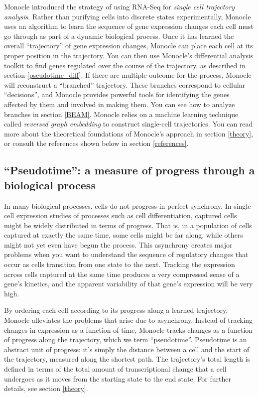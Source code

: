 \documentclass[10pt,oneside]{article}\usepackage[]{graphicx}\usepackage[]{color}
\begin{document}
 Monocle introduced the strategy of using RNA-Seq for \emph{single cell trajectory analysis}. Rather than purifying cells into discrete states experimentally, Monocle uses an algorithm to learn the sequence of gene expression changes each cell must go through as part of a dynamic biological process. Once it has learned the overall ``trajectory'' of gene expression changes, Monocle can place each cell at its proper position in the trajectory. You can then use Monocle's differential analysis toolkit to find genes regulated over the course of the trajectory, as described in section \ref{pseudotime_diff}. If there are multiple outcome for the process, Monocle will reconstruct a ``branched'' trajectory. These branches correspond to cellular ``decisions'', and Monocle provides powerful tools for identifying the genes affected by them and involved in making them. You can see how to analyze branches in section \ref{BEAM}. Monocle relies on a machine learning technique called \emph{reversed graph embedding} to construct single-cell trajectories. You can read more about the theoretical foundations of Monocle's approach in section \ref{theory}, or consult the references shown below in section \ref{references}.
 
 \subsection{``Pseudotime'': a measure of progress through a biological process }
 
 In many biological processes, cells do not progress in perfect synchrony.  In single-cell expression studies of processes such as cell differentiation, captured cells might be widely distributed in terms of progress.  That is, in a population of cells captured at exactly the same time, some cells might be far along, while others might not yet even have begun the process.  This asynchrony creates major problems when you want to understand the sequence of regulatory changes that occur as cells transition from one state to the next. Tracking the expression across cells captured at the same time produces a very compressed sense of a gene's kinetics, and the apparent variability of that gene's expression will be very high. 
 
 By ordering each cell according to its progress along a learned trajectory, Monocle alleviates the problems that arise due to asynchrony. Instead of tracking changes in expression as a function of time, Monocle tracks changes as a function of progress along the trajectory, which we term ``pseudotime''. Pseudotime is an abstract unit of progress: it's simply the distance between a cell and the start of the trajectory, measured along the shortest path. The trajectory's total length is defined in terms of the total amount of transcriptional change that a cell undergoes as it moves from the starting state to the end state. For further details, see section \ref{theory}.
 
\end{document}
